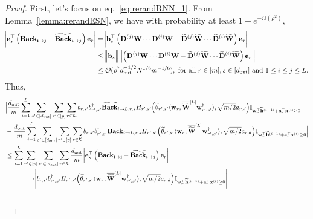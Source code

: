 \begin{proof}
			First, let's focus on eq.~\ref{eq:rerandRNN_1}. From Lemma~\ref{lemma:rerandESN}, we have with probability at least $1 - e^{-\Omega(\rho^2)}$,
			\begin{align*}
				\abs{\mathbf{e}_s^{\top} \left(\mathbf{Back_{i \to j}} - \widetilde{\mathbf{Back}}_{i \to j} \right) \mathbf{e}_r} 
				&= \abs{\mathbf{b}_s^{\top} \left( \mathbf{D}^{(j)} \mathbf{W} \cdots \mathbf{D}^{(i)} \mathbf{W} - \widetilde{\mathbf{D}}^{(j)} \widetilde{\mathbf{W}} \cdots \widetilde{\mathbf{D}}^{(i)} \widetilde{\mathbf{W}} \right) \mathbf{e}_r}
				\\&
				\le \norm[2]{\mathbf{b}_s} \norm[2]{\left( \mathbf{D}^{(j)} \mathbf{W} \cdots \mathbf{D}^{(i)} \mathbf{W} - \widetilde{\mathbf{D}}^{(j)} \widetilde{\mathbf{W}} \cdots \widetilde{\mathbf{D}}^{(i)} \widetilde{\mathbf{W}} \right) \mathbf{e}_r}
				\\&\le \mathcal{O}(\rho^7 d_{\mathrm{out}} ^{-1/2} N^{1/6} m^{-1/6}) , \text{ for all }  r \in [m], s \in [d_{\mathrm{out}} ] \text{ and } 1 \le i \le j \le L.
			\end{align*}
			Thus, 
			\begingroup \allowdisplaybreaks
			\begin{align}
				& \Big| \frac{\dout }{m} \sum_{i=1}^{L}  \sum_{s' \in [\dout ]} \sum_{r' \in [p]} \sum_{r \in \mathcal{K}}  b_{r, s'} b_{r', s'}^{\dagger} \widetilde{\mathbf{Back}}_{i \to L, r, s}  H_{r', s'}\Big(\widetilde{\theta}_{r', s'} \langle \mathbf{w}_{r}, \overline{\widetilde{\mathbf{W}}}^{[L]} \mathbf{w}_{r', s'}^{\dagger}\rangle , \sqrt{m/2} a_{r, d}\Big) \mathbb{I}_{\mathbf{w}_r^{\top} \widetilde{\mathbf{h}}^{(i-1)} + \mathbf{a}_r^{\top} \mathbf{x}^{(i)} \ge 0} \nonumber\\&
				-  \frac{\dout }{m} \sum_{i=1}^{L}  \sum_{s' \in [\dout ]} \sum_{r' \in [p]} \sum_{r \in \mathcal{K}}  b_{r, s'} b_{r', s'}^{\dagger} \mathbf{Back}_{i \to L, r, s}  H_{r', s'}\Big(\widetilde{\theta}_{r', s'} \langle \mathbf{w}_{r}, \overline{\widetilde{\mathbf{W}}}^{[L]} \mathbf{w}_{r', s'}^{\dagger}\rangle , \sqrt{m/2} a_{r, d}\Big) \mathbb{I}_{\mathbf{w}_r^{\top} \widetilde{\mathbf{h}}^{(i-1)} + \mathbf{a}_r^{\top} \mathbf{x}^{(i)} \ge 0} \Big|\nonumber\\&
				\le \sum_{i=1}^{L} \sum_{r' \in [p]} \sum_{s' \in [\dout ]} \sum_{r \in \mathcal{K}} \frac{\dout }{m} \abs{\mathbf{e}_s^{\top} \left(\mathbf{Back_{i \to j}} - \widetilde{\mathbf{Back}}_{i \to j} \right) \mathbf{e}_r}  \nonumber\\& \quad \quad \quad \quad \cdot \abs{b_{r, s'} b_{r', s'}^{\dagger}  H_{r', s'}\Big(\widetilde{\theta}_{r', s'} \langle \mathbf{w}_{r}, \overline{\widetilde{\mathbf{W}}}^{[L]} \mathbf{w}_{r', s'}^{\dagger}\rangle , \sqrt{m/2} a_{r, d}\Big) \mathbb{I}_{\mathbf{w}_r^{\top} \widetilde{\mathbf{h}}^{(i-1)} + \mathbf{a}_r^{\top} \mathbf{x}^{(i)} \ge 0}} \nonumber\\&

\end{align}
\end{proof}
